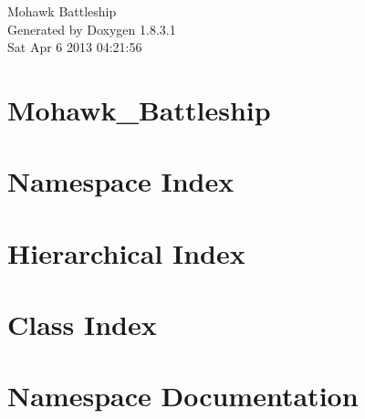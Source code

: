 \documentclass{book}
\begin{document}
\hypersetup{pageanchor=false,citecolor=blue}
\begin{titlepage}
\vspace*{7cm}
\begin{center}
{\Large Mohawk Battleship }\\
\vspace*{1cm}
{\large Generated by Doxygen 1.8.3.1}\\
\vspace*{0.5cm}
{\small Sat Apr 6 2013 04:21:56}\\
\end{center}
\end{titlepage}
\clearemptydoublepage
{}
\tableofcontents
\clearemptydoublepage
{}
\hypersetup{pageanchor=true,citecolor=blue}
\chapter{Mohawk\-\_\-\-Battleship}
\label{md_README}
\hypertarget{md_README}{}

\chapter{Namespace Index}

\chapter{Hierarchical Index}

\chapter{Class Index}

\chapter{Namespace Documentation}










\end{document}
